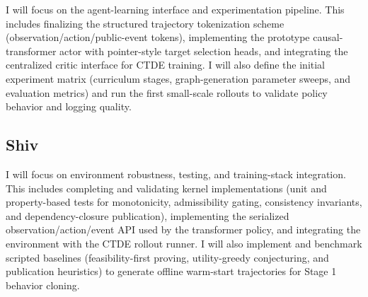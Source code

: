 \documentclass[letterpaper]{article} %
\begin{document}
I will focus on the agent-learning interface and experimentation pipeline. This includes finalizing the structured trajectory tokenization scheme (observation/action/public-event tokens), implementing the prototype causal-transformer actor with pointer-style target selection heads, and integrating the centralized critic interface for CTDE training. I will also define the initial experiment matrix (curriculum stages, graph-generation parameter sweeps, and evaluation metrics) and run the first small-scale rollouts to validate policy behavior and logging quality.

\subsection{Shiv}

I will focus on environment robustness, testing, and training-stack integration. This includes completing and validating kernel implementations (unit and property-based tests for monotonicity, admissibility gating, consistency invariants, and dependency-closure publication), implementing the serialized observation/action/event API used by the transformer policy, and integrating the environment with the CTDE rollout runner. I will also implement and benchmark scripted baselines (feasibility-first proving, utility-greedy conjecturing, and publication heuristics) to generate offline warm-start trajectories for Stage 1 behavior cloning.



\end{document}
